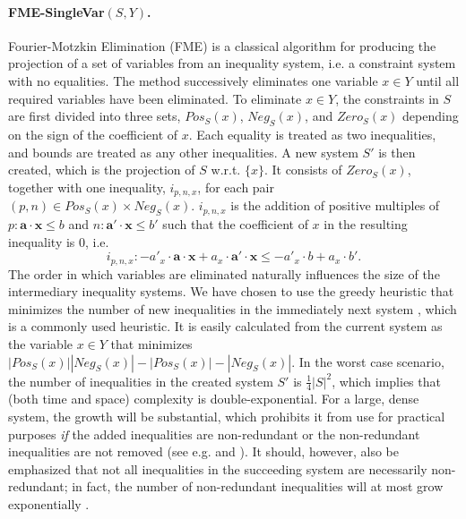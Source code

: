 \documentclass{llncs}
\newcommand{\Pos}{\mathit{Pos}}
\newcommand{\Neg}{\mathit{Neg}}
\newcommand{\mi}{\mathit}
\newcommand{\ve}{\mathbf}
\begin{document}
\paragraph{{\sc FME-SingleVar}$(S,Y)$.} Fourier-Motzkin Elimination (FME) is a classical algorithm for producing the projection of a set of variables from an inequality system, i.e. a constraint system with no equalities. The method successively eliminates one variable $x\in Y$ until all required variables have been eliminated. To eliminate $x\in Y$, the constraints in $S$ are first divided into three sets, $\Pos_S(x)$, $\Neg_S(x)$, and $\mi{Zero}_S(x)$ depending on the sign of the coefficient of $x$. Each equality is treated as two inequalities, and bounds are treated as any other inequalities. 
A new system $S'$ is then created, which is the projection of $S$ w.r.t. $\{x\}$. It consists of $\mi{Zero}_S(x)$, together with one inequality, $i_{p,n,x}$, for each pair $(p,n)\in \Pos_S(x)\times \Neg_S(x)$. $i_{p,n,x}$ is the addition of positive multiples of $p:\ve{a}\cdot\ve{x} \leq b$ and $n:\ve{a}'\cdot\ve{x} \leq b'$ such that the coefficient of $x$ in the resulting inequality is $0$, i.e.
\[
i_{p,n,x}: -a'_x\cdot \ve{a}\cdot\ve{x} + a_x\cdot \ve{a}'\cdot\ve{x} \leq -a'_x\cdot b + a_x\cdot b'.
\]
The order in which variables are eliminated naturally influences the size of the intermediary inequality systems. We have chosen to use the greedy heuristic {that minimizes the number of new inequalities in the immediately next system \cite{duffin74}}, which is a commonly used heuristic. It is easily calculated from the current system as the variable $x\in Y$ that minimizes $|\Pos_S(x)||\Neg_S(x)| - |\Pos_S(x)|-|\Neg_S(x)|$.  In the worst case scenario, %
the number of inequalities in the created system $S'$ is $\frac{1}{4}|S|^2$, which implies that (both time and space) complexity is double-exponential. For a large, dense system, the growth will be substantial, which prohibits it from use for practical purposes \emph{if} the added inequalities are non-redundant or the non-redundant inequalities are not removed ({see e.g. \cite{lassez93} and \cite{lukatskii08}}). It should, however, also be emphasized that not all inequalities in the succeeding system are necessarily non-redundant; in fact, the number of non-redundant inequalities will at most grow exponentially \cite{monniaux10}.
\end{document}
